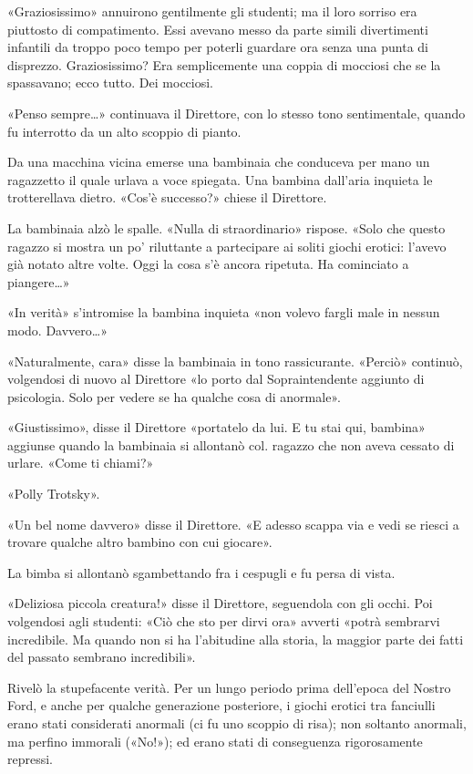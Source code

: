 \documentclass[
a5paper, %
10pt, %
twoside, 
onecolumn, %
openany, %
]{memoir}
\begin{document}
«Graziosissimo» annuirono gentilmente gli studenti; ma il loro sorriso era piuttosto di compatimento. Essi avevano messo da parte simili divertimenti infantili da troppo poco tempo per poterli guardare ora senza una punta di disprezzo. Graziosissimo? Era semplicemente una coppia di mocciosi che se la spassavano; ecco tutto. Dei mocciosi.

«Penso sempre…» continuava il Direttore, con lo stesso tono sentimentale, quando fu interrotto da un alto scoppio di pianto.

Da una macchina vicina emerse una bambinaia che conduceva per mano un ragazzetto il quale urlava a voce spiegata. Una bambina dall’aria inquieta le trotterellava dietro. «Cos’è successo?» chiese il Direttore.

La bambinaia alzò le spalle. «Nulla di straordinario» rispose. «Solo che questo ragazzo si mostra un po’ riluttante a partecipare ai soliti giochi erotici: l’avevo già notato altre volte. Oggi la cosa s’è ancora ripetuta. Ha cominciato a piangere…»

«In verità» s’intromise la bambina inquieta «non volevo fargli male in nessun modo. Davvero…»

«Naturalmente, cara» disse la bambinaia in tono rassicurante. «Perciò» continuò, volgendosi di nuovo al Direttore «lo porto dal Sopraintendente aggiunto di psicologia. Solo per vedere se ha qualche cosa di anormale».

«Giustissimo», disse il Direttore «portatelo da lui. E tu stai qui, bambina» aggiunse quando la bambinaia si allontanò col. ragazzo che non aveva cessato di urlare. «Come ti chiami?»

«Polly Trotsky».

«Un bel nome davvero» disse il Direttore. «E adesso scappa via e vedi se riesci a trovare qualche altro bambino con cui giocare».

La bimba si allontanò sgambettando fra i cespugli e fu persa di vista.

«Deliziosa piccola creatura!» disse il Direttore, seguendola con gli occhi. Poi volgendosi agli studenti: «Ciò che sto per dirvi ora» avverti «potrà sembrarvi incredibile. Ma quando non si ha l’abitudine alla storia, la maggior parte dei fatti del passato sembrano incredibili».

Rivelò la stupefacente verità. Per un lungo periodo prima dell’epoca del Nostro Ford, e anche per qualche generazione posteriore, i giochi erotici tra fanciulli erano stati considerati anormali (ci fu uno scoppio di risa); non soltanto anormali, ma perfino immorali («No!»); ed erano stati di conseguenza rigorosamente repressi.
\end{document}

